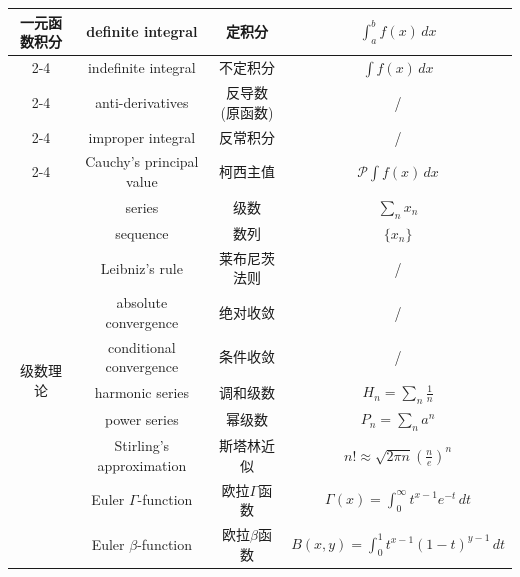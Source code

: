 \documentclass{article}
\begin{document}
\begin{longtable}{|c|c|c|c|}
    \hline
    \multirow{5}{*}{一元函数积分}
    & definite integral & 定积分 & $\int_{a}^{b}f(x)\, dx$ \\
    \cline{2-4}
    & indefinite integral & 不定积分 & $\int f(x)\, dx$ \\
    \cline{2-4}
    & anti-derivatives & 反导数(原函数) & / \\
    \cline{2-4}
    & improper integral & 反常积分 & / \\
    \cline{2-4}
    & Cauchy's principal value & 柯西主值 & $\mathcal{P}\int f(x)\, dx$ \\
    \hline
    \multirow{10}{*}{级数理论}
    & series & 级数 & $\sum\limits_{n}x_{n}$ \\
    \cline{2-4}
    & sequence & 数列 & $\{x_n\}$ \\
    \cline{2-4}
    & Leibniz's rule & 莱布尼茨法则 & / \\
    \cline{2-4}
    & absolute convergence & 绝对收敛 & / \\
    \cline{2-4}
    & conditional convergence & 条件收敛 & / \\
    \cline{2-4}
    & harmonic series & 调和级数 & $H_n=\sum\limits_{n}\frac{1}{n}$ \\
    \cline{2-4}
    & power series & 幂级数 & $P_n=\sum\limits_{n}a^n$ \\
    \cline{2-4}
    & Stirling's approximation & 斯塔林近似 & $n!\approx\sqrt{2\pi n}(\frac{n}{e})^n$ \\
    \cline{2-4}
    & Euler $\Gamma$-function & 欧拉$\Gamma$函数 & $\Gamma(x)=\int_{0}^{\infty}t^{x-1}e^{-t}\, dt$ \\
    \cline{2-4}
    & Euler $\beta$-function & 欧拉$\beta$函数 & $B(x,y)=\int_{0}^{1}t^{x-1}(1-t)^{y-1}\, dt$ \\  
    \hline
  \end{longtable}
\end{document}
